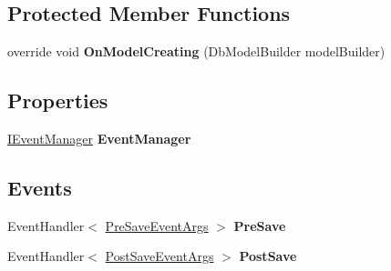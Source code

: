 \subsection*{Protected Member Functions}
\begin{DoxyCompactItemize}
\item 
\hypertarget{class_framework_extension_1_1_entity_framework_1_1_contexts_1_1_entity_framework_context_a227e8a3a9f7827eaa1623ca5c5aee7f5}{override void {\bfseries On\-Model\-Creating} (Db\-Model\-Builder model\-Builder)}\label{class_framework_extension_1_1_entity_framework_1_1_contexts_1_1_entity_framework_context_a227e8a3a9f7827eaa1623ca5c5aee7f5}

\end{DoxyCompactItemize}
\subsection*{Properties}
\begin{DoxyCompactItemize}
\item 
\hypertarget{class_framework_extension_1_1_entity_framework_1_1_contexts_1_1_entity_framework_context_a7d57df088997b433082fd6a8640bbfd9}{\hyperlink{interface_framework_extension_1_1_core_1_1_interfaces_1_1_i_event_manager}{I\-Event\-Manager} {\bfseries Event\-Manager}}\label{class_framework_extension_1_1_entity_framework_1_1_contexts_1_1_entity_framework_context_a7d57df088997b433082fd6a8640bbfd9}

\end{DoxyCompactItemize}
\subsection*{Events}
\begin{DoxyCompactItemize}
\item 
\hypertarget{class_framework_extension_1_1_entity_framework_1_1_contexts_1_1_entity_framework_context_a1053c137e7c1f17ae09c532771d02555}{Event\-Handler$<$ \hyperlink{class_framework_extension_1_1_core_1_1_interceptors_1_1_events_1_1_pre_save_event_args}{Pre\-Save\-Event\-Args} $>$ {\bfseries Pre\-Save}}\label{class_framework_extension_1_1_entity_framework_1_1_contexts_1_1_entity_framework_context_a1053c137e7c1f17ae09c532771d02555}

\item 
\hypertarget{class_framework_extension_1_1_entity_framework_1_1_contexts_1_1_entity_framework_context_a3315a34f2cee31f15e01e222f20b7c2c}{Event\-Handler$<$ \hyperlink{class_framework_extension_1_1_core_1_1_interceptors_1_1_events_1_1_post_save_event_args}{Post\-Save\-Event\-Args} $>$ {\bfseries Post\-Save}}\label{class_framework_extension_1_1_entity_framework_1_1_contexts_1_1_entity_framework_context_a3315a34f2cee31f15e01e222f20b7c2c}

\end{DoxyCompactItemize}


